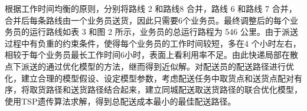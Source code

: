 \par 根据工作时间均衡的原则，分别将路线 2 和路线8 合并，路线 6 和路线 7 合并，合并后每条路线由一个业务员送货，因此只需要6个业务员。最终调整后的每个业务员的运行路线如表 3 和图 2 所示，业务员的总运行路程为 546 公里。由于派送过程中有负重的约束条件，使得每个业务员的工作时间较短，多在4 个小时左右，相较于每个业务员最长工作时间6小时，表面上看利用率不足。由此快递局部在散点下派送的通过优化模型的方法，继而得到近似解。对配送员的配送路径进行优化，建立合理的模型假设、设定模型参数，考虑配送任务中取货点和送货点配对有序，将取货路径和送货路径结合起来，建立同城配送取送货路径的联合优化模型，使用TSP遗传算法求解，得到总配送成本最小的最佳配送路径。